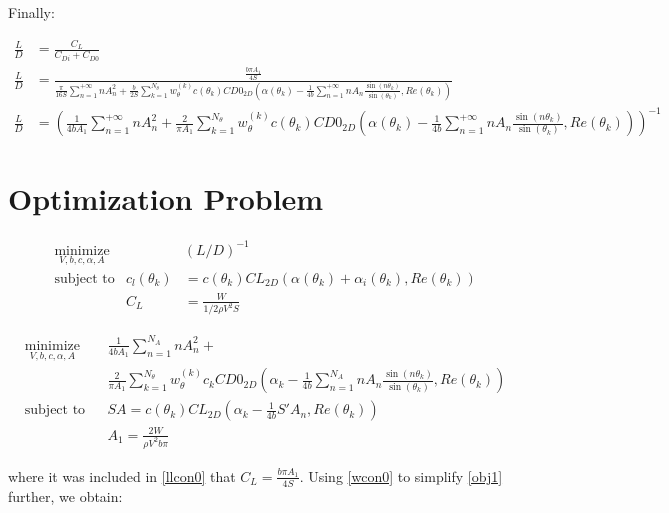 \documentclass[letterpaper,12pt]{article}
\begin{document}
Finally:

\begin{align}
	\frac L D &= \frac {C_L} 
	{C_{Di} + C_{D0}} \nonumber \\
	\frac L D &= \frac{\frac{b \pi A_1}{4S}}{
		\frac {\pi}{16S} \sum_{n=1}^{+\infty} n A_{n}^2 + 
		\frac b {2S} \sum_{k=1}^{N_{\theta}} w_{\theta}^{(k)} c(\theta_k) CD0_{2D}\left( \alpha(\theta_k) - \frac {1}{4b} \sum_{n=1}^{+\infty} n A_n \frac{ \sin(n\theta_k) }{\sin(\theta_k)} , Re(\theta_k)\right)
	} \nonumber \\
	\frac L D &= \left(	\frac {1}{4bA_1} \sum_{n=1}^{+\infty} n A_{n}^2 + 
		\frac {2} {\pi A_1} \sum_{k=1}^{N_{\theta}} w_{\theta}^{(k)} c(\theta_k) CD0_{2D}\left( \alpha(\theta_k) - \frac {1}{4b} \sum_{n=1}^{+\infty} n A_n \frac{ \sin(n\theta_k) }{\sin(\theta_k)} , Re(\theta_k)\right) 
	\right)^{-1} 
\end{align}


\section{Optimization Problem}

\begin{align}
	& \underset{V, b, c, \alpha, A}{\text{minimize}}
	& & \left( L / D\right)^{-1} \nonumber \\
	& \text{subject to} &  \label{llcon0}
	c_l(\theta_k) &= c(\theta_k) CL_{2D} \left( \alpha(\theta_k) + \alpha_i(\theta_k), Re(\theta_k)\right) \\
	& &  \label{wcon0} C_L &= \frac{W}{1/2 \rho V^2 S}
\end{align}


\begin{align}
	& \underset{V, b, c, \alpha, A}{\text{minimize}}
	& & \frac {1}{4bA_1} \sum_{n=1}^{N_A} n A_{n}^2 + \nonumber \\
	&&& \frac 2 {\pi A_1} \sum_{k=1}^{N_{\theta}} w_{\theta}^{(k)} c_k CD0_{2D}\left( 
		\alpha_k - 
		\frac {1}{4b} \sum_{n=1}^{N_A} n A_n \frac{ \sin(n\theta_k) }{\sin(\theta_k)} , Re(\theta_k)
		\right) \label{obj1} \\
	& \text{subject to}
	& & SA =  c(\theta_k)CL_{2D} \left( \alpha_k - \frac {1}{4b} S' A_n , Re(\theta_k)\right)  \label{llcon1}\\
	& &  & A_1 = \frac{2W}{\rho V^2 b \pi} \label{wcon1}
\end{align}

where it was included in \ref{llcon0} that $C_L = \frac{b \pi A_1}{4S}$.
Using \ref{wcon0} to simplify \ref{obj1} further, we obtain:
\end{document}
